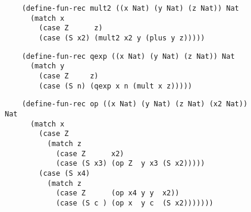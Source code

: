\begin{figure}
  \begin{verbatim}
    (define-fun-rec mult2 ((x Nat) (y Nat) (z Nat)) Nat
      (match x
        (case Z      z)
        (case (S x2) (mult2 x2 y (plus y z)))))
  \end{verbatim}

  \begin{verbatim}
    (define-fun-rec qexp ((x Nat) (y Nat) (z Nat)) Nat
      (match y
        (case Z     z)
        (case (S n) (qexp x n (mult x z)))))
  \end{verbatim}

  \begin{verbatim}
    (define-fun-rec op ((x Nat) (y Nat) (z Nat) (x2 Nat)) Nat
      (match x
        (case Z
          (match z
            (case Z      x2)
            (case (S x3) (op Z  y x3 (S x2)))))
        (case (S x4)
          (match z
            (case Z      (op x4 y y  x2))
            (case (S c ) (op x  y c  (S x2)))))))
  \end{verbatim}

  \iffalse
  \begin{verbatim}
    (define-fun-rec mul3acc ((x Nat) (y Nat) (z Nat)) Nat
      (match x
        (case Z Z)                          ;; Base case for 0 * y * z
        (case (S x2)
          (match y
            (case Z Z)                      ;; Base case for x * 0 * z
            (case (S x3)
              (match z
                (case Z Z)                  ;; Base case for x * y * 0
                (case (S x4)
                  (match x2
                    (case Z
                      (match x3
                        (case Z
                          (match x4
                            (case Z (S Z))  ;; Base case for 1 * 1 * 1
                            (case (S x5)
                              (S (add3acc (mul3acc Z Z x4)
                                          (add3acc (mul3acc (S Z) Z x4)
                                                   (mul3acc Z (S Z) x4)
                                                   (mul3acc Z Z (S Z)))
                                          (add3acc Z Z x4))))))
                        (case (S x6)
                          (S (add3acc (mul3acc Z x3 x4)
                                      (add3acc (mul3acc (S Z) x3 x4)
                                               (mul3acc Z (S Z) x4)
                                               (mul3acc Z x3 (S Z)))
                                      (add3acc Z x3 x4))))))
                    (case (S x7)
                      (S (add3acc (mul3acc x2 x3 x4)
                                  (add3acc (mul3acc (S Z) x3 x4)
                                           (mul3acc x2 (S Z) x4)
                                           (mul3acc x2 x3 (S Z)))
                                  (add3acc x2 x3 x4))))))))))))
  \end{verbatim}
  \fi


\end{figure}
